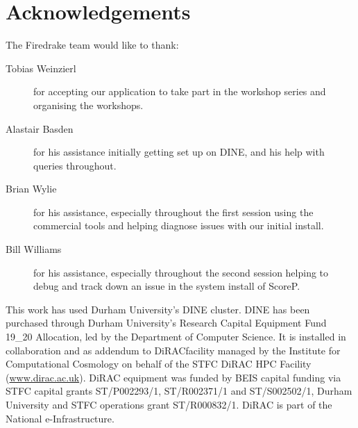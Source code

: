 \documentclass[a4paper,11pt]{article}
\begin{document}
\section*{Acknowledgements}
The Firedrake team would like to thank:
\begin{description}
	\item[Tobias Weinzierl] for accepting our application to take part in the workshop series and organising the workshops.
	\item[Alastair Basden] for his assistance initially getting set up on DINE, and his help with queries throughout.
	\item[Brian Wylie] for his assistance, especially throughout the first session using the commercial tools and helping diagnose issues with our initial install.
	\item[Bill Williams] for his assistance, especially throughout the second session helping to debug and track down an issue in the system install of ScoreP.
\end{description}

This work has used Durham University's DINE cluster. DINE has been purchased through Durham University’s Research Capital Equipment Fund 19\_20 Allocation, led by the Department of Computer Science. It is installed in collaboration and as addendum to DiRAC\@Durham facility managed by the Institute for Computational Cosmology on behalf of the STFC DiRAC HPC Facility (\url{www.dirac.ac.uk}). DiRAC equipment was funded by BEIS capital funding via STFC capital grants ST/P002293/1, ST/R002371/1 and ST/S002502/1, Durham University and STFC operations grant ST/R000832/1. DiRAC is part of the National e-Infrastructure.
\end{document}
